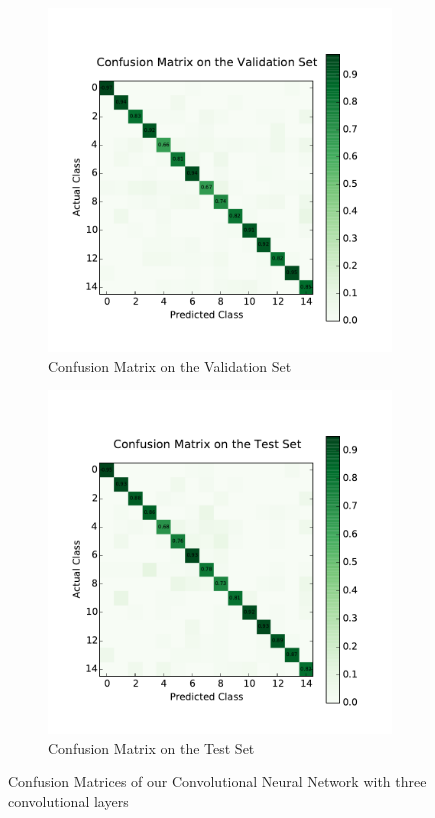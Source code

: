 \begin{figure}[H]
	\centering
	\begin{subfigure}[b]{0.45\linewidth}
		\centering
		\includegraphics[width=\linewidth]{images/3/cm_valid.pdf}
		\caption{Confusion Matrix on the Validation Set}
	\end{subfigure}
	\hfill
	\begin{subfigure}[b]{0.45\linewidth}
		\centering
		\includegraphics[width=\linewidth]{images/3/cm_test.pdf}
		\caption{Confusion Matrix on the Test Set}
	\end{subfigure}
	\caption{Confusion Matrices of our Convolutional Neural Network with three convolutional layers}
	\label{cnn_cm}
\end{figure}
